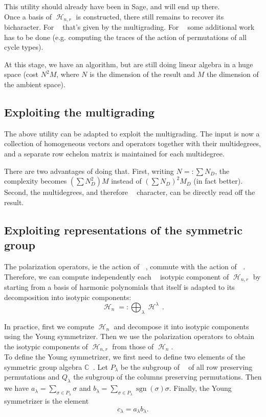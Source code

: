 \documentclass[letter,12pt]{article}
\newcommand{\CC}{\mathbb{C}}
\DeclareMathOperator{\Sn}{\mathbb{S}_n}
\DeclareMathOperator{\GLr}{GL_r}
\DeclareMathOperator{\harmonics}{\mathcal{H}}
\DeclareMathOperator{\sgn}{sgn}
\begin{document}
	This utility should already have been in Sage, and will end up there. \\
	
	Once a basis of $\harmonics_{n,r}$ is constructed, there still remains to recover its bicharacter. For $\GLr$ that's given by the multigrading. For $\Sn$ some additional work has to be done (e.g. computing the traces of the action of permutations of all cycle types).
	
	At this stage, we have an algorithm, but are still doing linear algebra in a huge space (cost $N^2 M$, where $N$ is the dimension of the result and $M$ the dimension of the ambient space).
	
	\subsection{Exploiting the multigrading}
	
	The above utility can be adapted to exploit the multigrading. The input is now a collection of homogeneous vectors and operators together with their multidegrees, and a separate row echelon matrix is maintained for each multidegree.
	
	There are two advantages of doing that. 
	First, writing $N=:\sum N_D$, the complexity becomes $(\sum N_D^2) M$ instead of $(\sum N_D)^2M_D$ (in fact better).
	Second, the multidegrees, and therefore $\GLr$ character, can be directly read off the result.
	
	\subsection{Exploiting representations of the symmetric group}
	
	The polarization operators, ie the action of $\GLr$, commute with the action of $\Sn$. Therefore, we can compute independently each $\Sn$ isotypic component of $\harmonics_{n,r}$ by starting from a basis of harmonic polynomials that itself is adapted to its decomposition into isotypic components:
	$$\harmonics_{n}=:\bigoplus_\lambda \harmonics^\lambda\,.$$
	
	In practice, first we compute $\harmonics_{n}$ and decompose it into isotypic components using the Young symmetrizer. Then we use the polarization operators to obtain the isotypic components of $\harmonics_{n,r}$ from those of $\harmonics_{n}$. \\
	
	To define the Young symmetrizer, we first need to define two elements of the symmetric group algebra $\CC \Sn$. Let $P_{\lambda}$ be the subgroup of $\Sn$ of all row preserving permutations and $Q_{\lambda}$ the subgroup of the columns preserving permutations. Then we have $a_{\lambda} = \sum_{\sigma \in P_{\lambda}} \sigma$ and  $b_{\lambda} = \sum_{\sigma \in P_{\lambda}} \sgn(\sigma) \sigma$. Finally, the Young symmetrizer is the element $$c_{\lambda} = a_{\lambda} b_{\lambda}.$$
	
\end{document}
